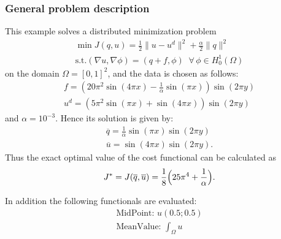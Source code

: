 \subsubsection{General problem description}
This example solves a distributed minimization problem
\begin{gather*}
\min J(q,u) = \frac{1}{2} \|u-u^d\|^2 + \frac{\alpha}{2}\|q\|^2\\
\text{s.t.} (\nabla u,\nabla \phi) = (q+f,\phi)\;\;\forall\,\phi \in H^1_0(\Omega)
\end{gather*}
on the domain $\Omega = [0,1]^2$, and the data is chosen as follows:
\begin{gather*}
 f = \left(20\pi^2  \sin(4 \pi x) - \frac{1}{\alpha}  \sin(\pi x)\right) \sin(2 \pi y)\\
 u^d = \left( 5 \pi^2 \sin(\pi x) + \sin(4 \pi x)\right)  \sin(2\pi y)
\end{gather*}
and $\alpha = 10^{-3}$.
Hence its solution is given by:
\begin{gather*}
 \overline{q} = \frac{1}{\alpha} \sin(\pi x) \sin(2 \pi y)\\
 \overline{u} = \sin(4 \pi x) \sin(2 \pi y).
\end{gather*}
Thus the exact optimal value of the cost functional can be calculated as 
\begin{gather*}
 J^* = J(\overline{q},\overline{u}) = \frac{1}{8}\Bigl(25\pi^4 + \frac{1}{\alpha}\Bigr).
\end{gather*}

In addition the following functionals are evaluated:
\begin{gather*}
  \text{MidPoint: } u(0.5 ; 0.5)\\[2mm]
  \text{MeanValue: }\int_\Omega u
\end{gather*}

